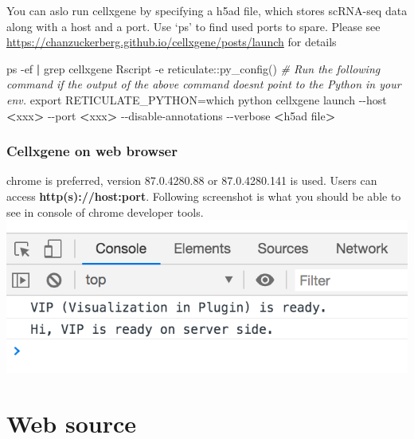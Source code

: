 \documentclass[
]{article}
\newenvironment{Shaded}{\begin{snugshade}}{\end{snugshade}}
\newcommand{\AttributeTok}[1]{\textcolor[rgb]{0.77,0.63,0.00}{#1}}
\newcommand{\BuiltInTok}[1]{#1}
\newcommand{\CommentTok}[1]{\textcolor[rgb]{0.56,0.35,0.01}{\textit{#1}}}
\newcommand{\ExtensionTok}[1]{#1}
\newcommand{\FunctionTok}[1]{\textcolor[rgb]{0.00,0.00,0.00}{#1}}
\newcommand{\KeywordTok}[1]{\textcolor[rgb]{0.13,0.29,0.53}{\textbf{#1}}}
\newcommand{\NormalTok}[1]{#1}
\newcommand{\OperatorTok}[1]{\textcolor[rgb]{0.81,0.36,0.00}{\textbf{#1}}}
\newcommand{\StringTok}[1]{\textcolor[rgb]{0.31,0.60,0.02}{#1}}
\newcommand{\VariableTok}[1]{\textcolor[rgb]{0.00,0.00,0.00}{#1}}
\begin{document}
You can aslo run cellxgene by specifying a h5ad file, which stores scRNA-seq data along with a host and a port.
Use `ps' to find used ports to spare. Please see \url{https://chanzuckerberg.github.io/cellxgene/posts/launch} for details

\begin{Shaded}
\begin{Highlighting}[]
\FunctionTok{ps} \AttributeTok{{-}ef} \KeywordTok{|} \FunctionTok{grep}\NormalTok{ cellxgene}
\ExtensionTok{Rscript} \AttributeTok{{-}e} \StringTok{\textquotesingle{}reticulate::py\_config()\textquotesingle{}}
\CommentTok{\# Run the following command if the output of the above command doesn\textquotesingle{}t point to the Python in your env.}
\BuiltInTok{export} \VariableTok{RETICULATE\_PYTHON=}\KeywordTok{\textasciigrave{}}\FunctionTok{which}\NormalTok{ python}\KeywordTok{\textasciigrave{}}
\ExtensionTok{cellxgene}\NormalTok{ launch }\AttributeTok{{-}{-}host} \OperatorTok{\textless{}}\NormalTok{xxx}\OperatorTok{\textgreater{}}\NormalTok{ {-}{-}port }\OperatorTok{\textless{}}\NormalTok{xxx}\OperatorTok{\textgreater{}}\NormalTok{ {-}{-}disable{-}annotations }\AttributeTok{{-}{-}verbose} \OperatorTok{\textless{}}\NormalTok{h5ad file}\OperatorTok{\textgreater{}}
\end{Highlighting}
\end{Shaded}

\hypertarget{cellxgene-on-web-browser}{%
\subsubsection{Cellxgene on web browser}\label{cellxgene-on-web-browser}}

chrome is preferred, version 87.0.4280.88 or 87.0.4280.141 is used. Users can access \textbf{http(s)://host:port}.
Following screenshot is what you should be able to see in console of chrome developer tools.
\includegraphics{cellonweb.png}

\hypertarget{web-source}{%
\section{Web source}\label{web-source}}
\end{document}
